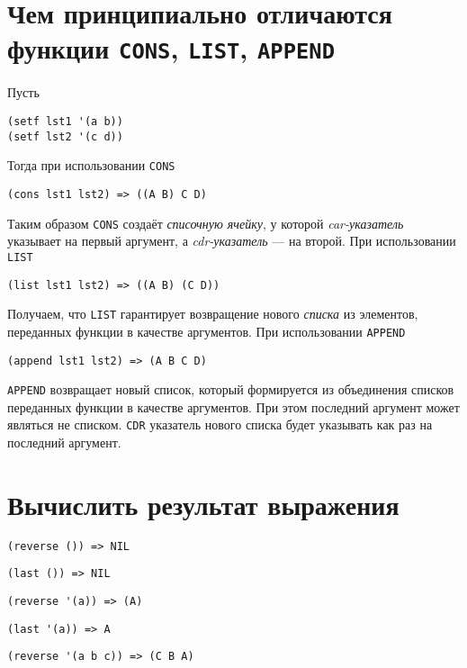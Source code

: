 
\section{Чем принципиально отличаются функции \texttt{CONS}, \texttt{LIST}, \texttt{APPEND}}

Пусть
\begin{lstlisting}
(setf lst1 '(a b))
(setf lst2 '(c d))
\end{lstlisting}
Тогда при использовании \verb|CONS|
\begin{lstlisting}
(cons lst1 lst2) => ((A B) C D) 
\end{lstlisting}
Таким образом \verb|CONS| создаёт \textit{списочную ячейку}, у которой \textit{car-указатель} указывает на первый аргумент, а \textit{cdr-указатель} --- на второй.
При использовании \verb|LIST|
\begin{lstlisting}
(list lst1 lst2) => ((A B) (C D)) 
\end{lstlisting}
Получаем, что \verb|LIST| гарантирует возвращение нового \textit{списка} из элементов, переданных функции в качестве аргументов.
При использовании \verb|APPEND|
\begin{lstlisting}
(append lst1 lst2) => (A B C D)
\end{lstlisting}
\verb|APPEND| возвращает новый список, который формируется из объединения списков переданных функции в качестве аргументов. При этом последний аргумент может являться не списком. \verb|CDR| указатель нового списка будет указывать как раз на последний аргумент.


\section{Вычислить результат выражения}

\problem \hfill

\begin{lstlisting}
(reverse ()) => NIL
\end{lstlisting}


\problem \hfill

\begin{lstlisting}
(last ()) => NIL
\end{lstlisting}


\problem \hfill

\begin{lstlisting}
(reverse '(a)) => (A)
\end{lstlisting}


\problem \hfill

\begin{lstlisting}
(last '(a)) => A
\end{lstlisting}


\problem \hfill

\begin{lstlisting}
(reverse '(a b c)) => (C B A)
\end{lstlisting}